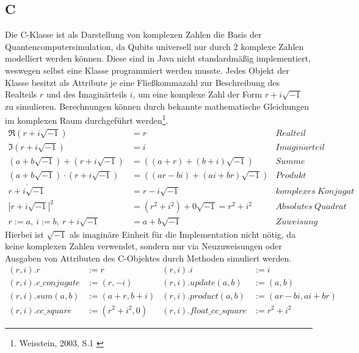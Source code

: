 \documentclass[12pt]{report}
\begin{document}
\subsection{C}
Die \glqq C\grqq{}-Klasse ist als Darstellung von komplexen Zahlen die Basis der Quantencomputersimulation, da Qubits universell nur durch 2 komplexe Zahlen modelliert werden können. Diese sind in Java nicht standardmäßig implementiert, weswegen selbst eine Klasse programmiert werden musste. Jedes Objekt der Klasse besitzt als Attribute je eine Fließkommazahl zur Beschreibung des Realteils $r$ und des Imaginärteils $i$, um eine komplexe Zahl der Form $r+i\sqrt{-1}$ zu simulieren.
Berechnungen können durch bekannte mathematische Gleichungen im komplexen Raum durchgeführt werden\footnote{Weisstein, 2003, S.1 \cite{p4-4}}.
\begin{align}
	\Re(r+i\sqrt{-1}) &= r & Realteil\\
	\Im(r+i\sqrt{-1}) &= i & Imagin\ddot{a} rteil\\
	(a+b\sqrt{-1}) + (r+i\sqrt{-1}) &= ((a+r)+(b+i)\sqrt{-1}) & Summe\\
	(a+b\sqrt{-1}) \cdot (r+i\sqrt{-1}) &= ((ar-bi)+(ai+br)\sqrt{-1}) & Produkt\\
	\overline{r+i\sqrt{-1}} &= r-i\sqrt{-1} & komplexes~Konjugat\\
	|r+i\sqrt{-1}|^2 &= (r^2+i^2)+0\sqrt{-1} = r^2+i^2 & Absolutes~Quadrat\\
	r:=a,~ i:=b,~ r+i\sqrt{-1} &= a+b\sqrt{-1} & Zuweisung
\end{align}
Hierbei ist $\sqrt{-1}$ als imaginäre Einheit für die Implementation nicht nötig, da keine komplexen Zahlen verwendet, sondern nur via Neuzuweisungen oder Ausgaben von Attributen des \glqq C\grqq{}-Objektes durch Methoden simuliert werden.
\begin{align}
	(r,i).r &:= r & (r,i).i &:= i \\
	(r,i).c\_conjugate &:= (r,-i) & (r,i).update(a,b) &:= (a,b) \\
	(r,i).sum(a,b) &:= (a+r,b+i) & (r,i).product(a,b) &:= (ar-bi,ai+br)\\ 
	(r,i).cc\_square &:= (r^2+i^2,0) & (r,i).float\_cc\_square &:= r^2+i^2
\end{align}
\end{document}
